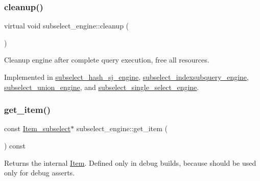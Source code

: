 \subsubsection{\texorpdfstring{cleanup()}{cleanup()}}
{\footnotesize\ttfamily virtual void subselect\+\_\+engine\+::cleanup (\begin{DoxyParamCaption}{ }\end{DoxyParamCaption})\hspace{0.3cm}{\ttfamily [pure virtual]}}

Cleanup engine after complete query execution, free all resources. 

Implemented in \mbox{\hyperlink{classsubselect__hash__sj__engine_a2543ad3f7c4cd6ab5e774d6c4eb9ef64}{subselect\+\_\+hash\+\_\+sj\+\_\+engine}}, \mbox{\hyperlink{classsubselect__indexsubquery__engine_a185f036d8ce8517de313c2b796b4b060}{subselect\+\_\+indexsubquery\+\_\+engine}}, \mbox{\hyperlink{classsubselect__union__engine_ae433d4bdefcf00170920ace3c91332cc}{subselect\+\_\+union\+\_\+engine}}, and \mbox{\hyperlink{classsubselect__single__select__engine_a971db624407ef715670e8652cf6bff06}{subselect\+\_\+single\+\_\+select\+\_\+engine}}.

\mbox{\label{classsubselect__engine_ad031f8bb97523c5d8eb14cb8fa6f3060}} 
\subsubsection{\texorpdfstring{get\+\_\+item()}{get\_item()}}
{\footnotesize\ttfamily const \mbox{\hyperlink{classItem__subselect}{Item\+\_\+subselect}}$\ast$ subselect\+\_\+engine\+::get\+\_\+item (\begin{DoxyParamCaption}{ }\end{DoxyParamCaption}) const\hspace{0.3cm}{\ttfamily [inline]}}

\begin{DoxyReturn}{Returns}
the internal \mbox{\hyperlink{classItem}{Item}}. Defined only in debug builds, because should be used only for debug asserts. 
\end{DoxyReturn}
\mbox{\label{classsubselect__engine_a34d0d6c15d4ed548b014d2703f6de14f}} 
